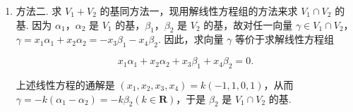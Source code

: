 \documentclass[12pt,fontset=fandol]{ctexart}
\begin{document}
\begin{solve}
\begin{enumerate}
              所以就可以取 $\alpha_1$，$\alpha_2$，$\beta_1$ 为 $V_1 + V_2$ 的基（不唯一）.

              下面再来取 $V_1\cap V_2$ 的基，首先注意到 $\alpha_1$，$\alpha_2$ 是 $V_1$ 的基（从上面的矩阵即可看出），又不难验证 $\beta_1$，$\beta_2$ 是 $V_2$ 的基，$V_2$ 中的向量可以表示为 $\beta_1$，$\beta_2$ 的线性组合. 假设 $t_1\beta_1 + t_2\beta_2$ 属于 $V_1$，则向量组 $\alpha_1, \alpha_2, t_1\beta_1 + t_2\beta_2$ 和向量组 $\alpha_1, \alpha_2$ 的秩相等（因为 $\alpha_1, \alpha_2$ 是 $V_1$ 的基）. 因此，我们可以用矩阵方法来求出参数 $t_1, t_2$. 注意到
              \[ \begin{pmatrix}
                      1  & 0 & -t + t_2   \\
                      0  & 1 & t_1 - t_2  \\
                      -1 & 2 & t_1 - 3t_2 \\
                      0  & 1 & -t_1 - t_2
                  \end{pmatrix} \xrightarrow{} \begin{pmatrix}
                      1 & 0 & -t + t_2  \\
                      0 & 1 & t_1 - t_2 \\
                      0 & 2 & -2t_2     \\
                      0 & 0 & 0
                  \end{pmatrix} \xrightarrow{} \begin{pmatrix}
                      1 & 0 & -t + t_2  \\
                      0 & 1 & t_1 - t_2 \\
                      0 & 0 & -2t_1     \\
                      0 & 0 & 0
                  \end{pmatrix} \]

              所以可以得出当且仅当 $t_1 = 0$ 时 $t_1\beta_1 + t_2\beta_2$ 属于 $V_1$，所以 $V_1 \cap V_2$ 的基可取为 $\beta_2$.

        \item 方法二. 求 $V_1 + V_2$ 的基同方法一，现用解线性方程组的方法来求 $V_1 \cap V_2$ 的基. 因为 $\alpha_1$，$\alpha_2$ 是 $V_1$ 的基，$\beta_1$，$\beta_2$ 是 $V_2$ 的基，故对任一向量 $\gamma \in V_1 \cap V_2$，$\gamma = x_1\alpha_1 + x_2\alpha_2 = -x_3\beta_1 - x_4\beta_2$. 因此，求向量 $\gamma$ 等价于求解线性方程组

              \[ x_1\alpha_1 + x_2\alpha_2 + x_3\beta_1 + x_4\beta_2 = 0. \]

              上述线性方程的通解是 $(x_1, x_2, x_3, x_4) = k(-1, 1, 0, 1)$，从而 $\gamma = -k(\alpha_1 - \alpha_2) = -k\beta_2 (k \in \mathbf{R})$，于是 $\beta_2$ 是 $V_1 \cap V_2$ 的基.
    \end{enumerate}
\end{solve}
\end{document}
